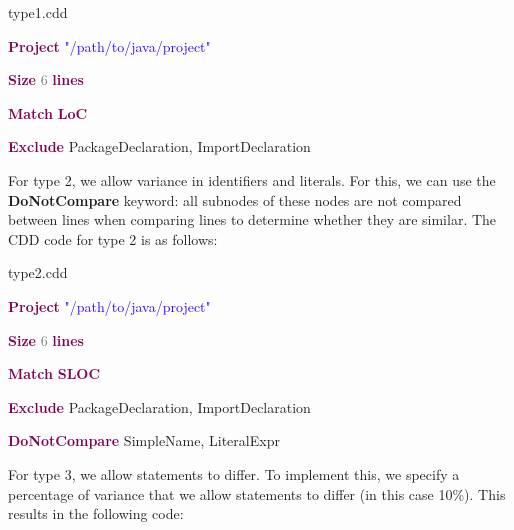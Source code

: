 \documentclass[sigplan,10pt,review,anonymous]{acmart}
\begin{document}
\noindent\makebox[\linewidth]{\rule{\linewidth}{0.4pt}}
\noindent type1.cdd\par
\noindent\makebox[\linewidth]{\rule{\linewidth}{0.4pt}}
\noindent\textbf{\textcolor[HTML]{7F0055}{Project}} \textcolor[HTML]{2A00FF}{"/path/to/java/project"} \par
\noindent\textbf{\textcolor[HTML]{7F0055}{Size}} \textcolor[HTML]{7D7D7D}{6} \textbf{\textcolor[HTML]{7F0055}{lines}}  \par
\noindent\textbf{\textcolor[HTML]{7F0055}{Match}} \textbf{\textcolor[HTML]{7F0055}{LoC}}  \par
\noindent\textbf{\textcolor[HTML]{7F0055}{Exclude}} PackageDeclaration, ImportDeclaration \\
\noindent\makebox[\linewidth]{\rule{\linewidth}{0.4pt}}

For type 2, we allow variance in identifiers and literals. For this, we can use the \textbf{DoNotCompare} keyword: all subnodes of these nodes are not compared between lines when comparing lines to determine whether they are similar. The CDD code for type 2 is as follows:

\noindent\makebox[\linewidth]{\rule{\linewidth}{0.4pt}}
\noindent type2.cdd\par
\noindent\makebox[\linewidth]{\rule{\linewidth}{0.4pt}}
\noindent\textbf{\textcolor[HTML]{7F0055}{Project}} \textcolor[HTML]{2A00FF}{"/path/to/java/project"}\par
\noindent\textbf{\textcolor[HTML]{7F0055}{Size}} \textcolor[HTML]{7D7D7D}{6} \textbf{\textcolor[HTML]{7F0055}{lines}}\par
\noindent\textbf{\textcolor[HTML]{7F0055}{Match}} \textbf{\textcolor[HTML]{7F0055}{SLOC}}\par
\noindent\textbf{\textcolor[HTML]{7F0055}{Exclude}} PackageDeclaration, ImportDeclaration\par
\noindent\textbf{\textcolor[HTML]{7F0055}{DoNotCompare}} SimpleName, LiteralExpr\par
\noindent\makebox[\linewidth]{\rule{\linewidth}{0.4pt}}

For type 3, we allow statements to differ. To implement this, we specify a percentage of variance that we allow statements to differ (in this case 10\%). This results in the following code:
\end{document}
